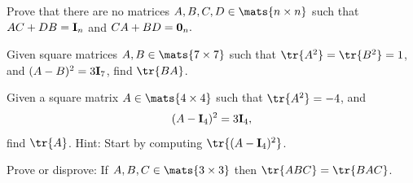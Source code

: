 \begin{pro}

Prove that there are no matrices $A, B, C, D\in \mats{n\times
n}$ such that
$AC + DB = {\bf I}_n$ and 
$CA + BD = {\bf 0}_n.$
\end{pro}

\begin{pro}
Given square matrices $A, B \in \mats{7\times 7}$ such
that $\tr{A^2} = \tr{B^2} = 1$, and
$ (A - B)^2 = 3{\bf I}_7$, 
find $\tr{BA}$.
\end{pro}

\begin{pro}
Given a square matrix $A \in \mats{4\times 4}$ such that
$\tr{A^2} = -4$, and $$ (A - {\bf I}_4)^2 = 3{\bf I}_4, $$
find $\tr{A}$.
Hint: Start by computing $\tr{(A - {\bf I}_4)^2}$.
\end{pro}


\begin{pro}
Prove or disprove: If $A, B, C\in\mats{3\times 3}$ then
$\tr{ABC} = \tr{BAC}$. 
\end{pro}

